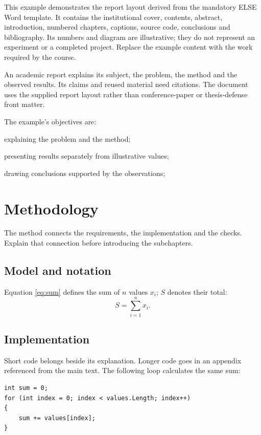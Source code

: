 \documentclass{../shared/classes/utmreport}
\begin{document}
\makeutmreporttitlepage
\tableofcontents
\clearpage

\begin{utmabstract}[Abstract]
This example demonstrates the report layout derived from the mandatory ELSE Word template. It contains the institutional cover, contents, abstract, introduction, numbered chapters, captions, source code, conclusions and bibliography. Its numbers and diagram are illustrative; they do not represent an experiment or a completed project. Replace the example content with the work required by the course.
\end{utmabstract}

\utmintroduction
An academic report explains its subject, the problem, the method and the observed results. Its claims and reused material need citations. The document uses the supplied report layout rather than conference-paper or thesis-defense front matter.

The example's objectives are:
\begin{utmenumerate}
\item explaining the problem and the method;
\item presenting results separately from illustrative values;
\item drawing conclusions supported by the observations;
\end{utmenumerate}

\chapter{Methodology}
The method connects the requirements, the implementation and the checks. Explain that connection before introducing the subchapters.
\section{Model and notation}
Equation \ref{eq:sum} defines the sum of $n$ values $x_i$; $S$ denotes their total:
\begin{equation}\label{eq:sum}
S=\sum_{i=1}^{n}x_i.
\end{equation}
\section{Implementation}
Short code belongs beside its explanation. Longer code goes in an appendix referenced from the main text. The following loop calculates the same sum:
\begin{lstlisting}
int sum = 0;
for (int index = 0; index < values.Length; index++)
{
    sum += values[index];
}
\end{lstlisting}
\end{document}
